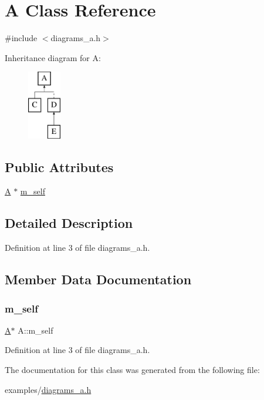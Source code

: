\hypertarget{class_a}{}\section{A Class Reference}
\label{class_a}


{\ttfamily \#include $<$diagrams\+\_\+a.\+h$>$}

Inheritance diagram for A\+:\begin{figure}[H]
\begin{center}
\leavevmode
\includegraphics[height=3.000000cm]{class_a}
\end{center}
\end{figure}
\subsection*{Public Attributes}
\begin{DoxyCompactItemize}
\item 
\mbox{\hyperlink{class_a}{A}} $\ast$ \mbox{\hyperlink{class_a_a086d3a4efc697dba0601b9fef3d082ad}{m\+\_\+self}}
\end{DoxyCompactItemize}


\subsection{Detailed Description}


Definition at line 3 of file diagrams\+\_\+a.\+h.



\subsection{Member Data Documentation}
\mbox{\label{class_a_a086d3a4efc697dba0601b9fef3d082ad}} 
\subsubsection{\texorpdfstring{m\_self}{m\_self}}
{\footnotesize\ttfamily \mbox{\hyperlink{class_a}{A}}$\ast$ A\+::m\+\_\+self}



Definition at line 3 of file diagrams\+\_\+a.\+h.



The documentation for this class was generated from the following file\+:\begin{DoxyCompactItemize}
\item 
examples/\mbox{\hyperlink{diagrams__a_8h}{diagrams\+\_\+a.\+h}}\end{DoxyCompactItemize}
